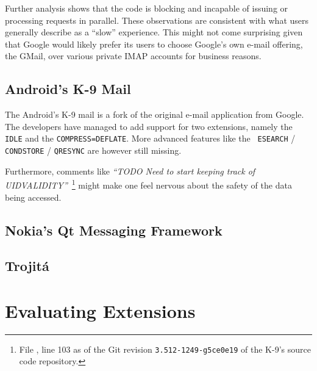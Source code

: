 \documentclass[trojita]{subfiles}
\begin{document}
Further analysis shows that the code is blocking and incapable of issuing or processing requests in parallel.  These
observations are consistent with what users generally describe as a ``slow'' experience.  This might not come surprising
given that Google would likely prefer its users to choose Google's own e-mail offering, the GMail, over various private
IMAP accounts for business reasons.

\subsection{Android's K-9 Mail}

The Android's K-9 mail is a fork of the original e-mail application from Google.  The developers have managed to add
support for two extensions, namely the {\tt IDLE} and the {\tt COMPRESS=DEFLATE}.  More advanced features like the {\tt
ESEARCH} / {\tt CONDSTORE} / {\tt QRESYNC} are however still missing.

Furthermore, comments like {\em ``TODO Need to start keeping track of UIDVALIDITY''}~\footnote{File
, line 103 as of the Git revision {\tt 3.512-1249-g5ce0e19} of the K-9's
source code repository.} might make one feel nervous about the safety of the data being accessed.

\subsection{Nokia's Qt Messaging Framework}


\subsection{Trojitá}


\section{Evaluating Extensions}
\end{document}
